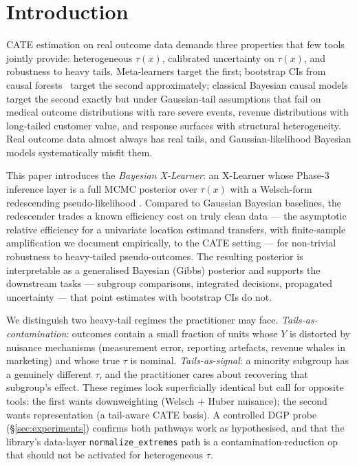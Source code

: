 \section{Introduction}
\label{sec:intro}


CATE estimation on real outcome data demands three properties that
few tools jointly provide: heterogeneous $\tau(x)$, calibrated
uncertainty on $\tau(x)$, and robustness to heavy tails. Meta-learners
\citep{kunzel2019metalearners} target the first; bootstrap CIs from
causal forests~\citep{wager2018estimation} target the second
approximately; classical Bayesian causal models
\citep{hill2011bayesian,hahn2020bcf} target the second exactly but
under Gaussian-tail assumptions that fail on medical outcome
distributions with rare severe events, revenue distributions with
long-tailed customer value, and response surfaces with structural
heterogeneity. Real outcome data almost always has real tails, and
Gaussian-likelihood Bayesian models systematically misfit them.

This paper introduces the \emph{Bayesian X-Learner}: an X-Learner
whose Phase-3 inference layer is a full MCMC posterior over
$\tau(x)$ with a Welsch-form redescending pseudo-likelihood
\citep{dennis1978techniques}. Compared to Gaussian Bayesian baselines, the
redescender trades a known efficiency cost on truly clean data
\citep{huber1964robust,huber2009robust} --- the asymptotic relative
efficiency for a univariate location estimand transfers, with
finite-sample amplification we document empirically, to the CATE
setting --- for non-trivial robustness to heavy-tailed
pseudo-outcomes. The resulting posterior
is interpretable as a generalised Bayesian (Gibbs) posterior and supports the
downstream tasks --- subgroup comparisons, integrated decisions,
propagated uncertainty --- that point estimates with bootstrap CIs
do not.

We distinguish two heavy-tail regimes the practitioner may face.
\emph{Tails-as-contamination}: outcomes contain a small fraction of
units whose $Y$ is distorted by nuisance mechanisms
(measurement error, reporting artefacts, revenue whales in marketing)
and whose true $\tau$ is nominal. \emph{Tails-as-signal}: a minority
subgroup has a genuinely different $\tau$, and the practitioner cares
about recovering that subgroup's effect. These regimes look
superficially identical but call for opposite tools: the first wants
downweighting (Welsch + Huber nuisance); the second wants
representation (a tail-aware CATE basis). A controlled DGP probe
(\S\ref{sec:experiments}) confirms both pathways work as
hypothesised, and that the library's data-layer
\texttt{normalize\_extremes} path is a contamination-reduction op that
should not be activated for heterogeneous $\tau$.

